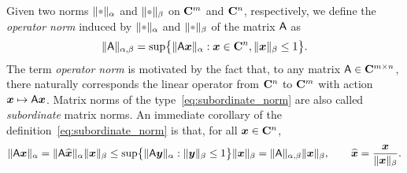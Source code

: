 Given two norms $\norm{\placeholder}_{\alpha}$ and $\norm{\placeholder}_{\beta}$ on $\mathbf C^m$ and $\mathbf C^n$, respectively,
we define the \emph{operator norm} induced by $\norm{\placeholder}_{\alpha}$ and $\norm{\placeholder}_{\beta}$ of the matrix $\mathsf A$ as
\begin{equation}
    \label{eq:subordinate_norm}
    \lVert\mathsf A\rVert_{\alpha,\beta} = \sup \bigl\{ \lVert\mathsf A \mathbf{\boldsymbol{x}}\rVert_{\alpha} : \mathbf{\boldsymbol{x}} \in \mathbf C^n, \lVert\mathbf{\boldsymbol{x}}\rVert_{\beta} \leq 1 \bigr\}.
\end{equation}
The term \emph{operator norm} is motivated by the fact that,
to any matrix $\mathsf A \in \mathbf C^{m \times n}$, there naturally corresponds the linear operator from $\mathbf C^n$ to $\mathbf C^m$ with action~$\mathbf{\boldsymbol{x}} \mapsto \mathsf A \mathbf{\boldsymbol{x}}$.
Matrix norms of the type~\eqref{eq:subordinate_norm} are also called \emph{subordinate} matrix norms.
An immediate corollary of the definition~\eqref{eq:subordinate_norm} is that,
for all $\mathbf{\boldsymbol{x}} \in \mathbf C^n$,
\begin{equation}
    \label{eq:submultiplicative_mat_vec}%
    \norm{\mat A \vect x}_{\alpha}
    = \norm{\mat A \widehat{\vect x}}_{\alpha} \norm{\vect x}_{\beta}
    \leq \sup \bigl\{ \norm{\mat A \vect y}_{\alpha}: \norm{\vect y}_{\beta} \leq 1 \bigr\} \norm{\vect x}_{\beta}
    = \norm{\mat A}_{\alpha,\beta} \norm{\vect x}_{\beta},
    \qquad \widehat {\vect x} = \frac{\vect x}{\norm{\vect x}_{\beta}}.
\end{equation}

